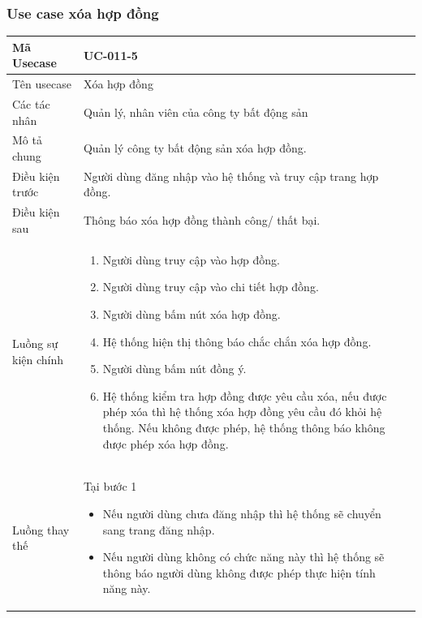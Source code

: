 \documentclass[12pt,a4paper]{article}
\begin{document}
    \subsubsection*{Use case xóa hợp đồng }
    \begin{table}[H]
        \centering
        \begin{tabular}{|p{3.5cm}|p{11.5cm}|c|}
            \hline
            Mã Usecase      & UC-011-5                                                      \\
            \hline
            Tên usecase     & Xóa hợp đồng                                                  \\
            \hline
            Các tác nhân    & Quản lý, nhân viên của công ty bất động sản                   \\
            \hline
            Mô tả chung     & Quản lý công ty bất động sản xóa hợp đồng.                    \\
            \hline

            Điều kiện trước & Người dùng đăng nhập vào hệ thống và truy cập trang hợp đồng. \\
            \hline

            Điều kiện sau   & Thông báo xóa hợp đồng thành công/ thất bại.                  \\
            \hline

            Luồng sự kiện chính & \vspace{-.8cm}\begin{enumerate}
                                                    \item Người dùng truy cập vào hợp đồng.
                                                    \item Người dùng truy cập vào chi tiết hợp đồng.
                                                    \item  Người dùng bấm nút xóa hợp đồng.
                                                    \item  Hệ thống hiện thị thông báo chắc chắn xóa hợp đồng.
                                                    \item  Người dùng bấm nút đồng ý.
                                                    \item Hệ thống kiểm tra hợp đồng được yêu cầu xóa, nếu được phép xóa thì hệ thống xóa hợp đồng yêu cầu đó khỏi hệ thống. Nếu không được phép, hệ thống thông báo không được phép xóa hợp đồng.
            \end{enumerate}
            \\
            \hline
            Luồng thay thế & Tại bước 1\newline
            \vspace{-.8cm}\begin{itemize}
                              \item Nếu người dùng chưa đăng nhập thì hệ thống sẽ chuyển sang trang đăng nhập.
                              \item Nếu người dùng không có chức năng này thì hệ thống sẽ thông báo người dùng không được phép thực hiện tính năng này.
            \end{itemize}


\end{tabular}
\end{table}
\end{document}
